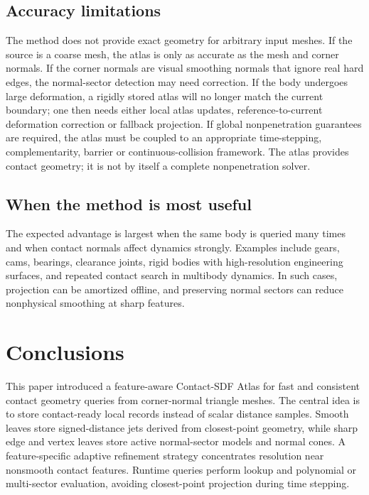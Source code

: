 \documentclass[preprint,12pt,sort&compress]{elsarticle}
\begin{document}
\subsection{Accuracy limitations}

The method does not provide exact geometry for arbitrary input meshes. If the source is a coarse mesh, the atlas is only as accurate as the mesh and corner normals. If the corner normals are visual smoothing normals that ignore real hard edges, the normal-sector detection may need correction. If the body undergoes large deformation, a rigidly stored atlas will no longer match the current boundary; one then needs either local atlas updates, reference-to-current deformation correction or fallback projection. If global nonpenetration guarantees are required, the atlas must be coupled to an appropriate time-stepping, complementarity, barrier or continuous-collision framework. The atlas provides contact geometry; it is not by itself a complete nonpenetration solver.

\subsection{When the method is most useful}

The expected advantage is largest when the same body is queried many times and when contact normals affect dynamics strongly. Examples include gears, cams, bearings, clearance joints, rigid bodies with high-resolution engineering surfaces, and repeated contact search in multibody dynamics. In such cases, projection can be amortized offline, and preserving normal sectors can reduce nonphysical smoothing at sharp features.

\section{Conclusions}
\label{sec:conclusion}

This paper introduced a feature-aware Contact-SDF Atlas for fast and consistent contact geometry queries from corner-normal triangle meshes. The central idea is to store contact-ready local records instead of scalar distance samples. Smooth leaves store signed-distance jets derived from closest-point geometry, while sharp edge and vertex leaves store active normal-sector models and normal cones. A feature-specific adaptive refinement strategy concentrates resolution near nonsmooth contact features. Runtime queries perform lookup and polynomial or multi-sector evaluation, avoiding closest-point projection during time stepping.
\end{document}
